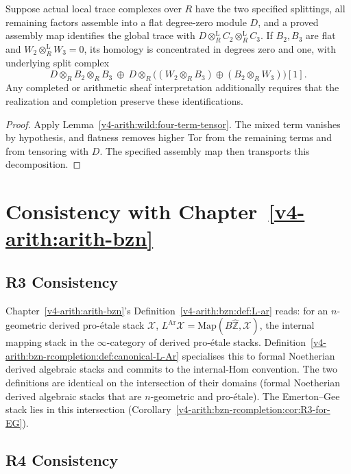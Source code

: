 \begin{corollary}
\label{v4-arith:bzn-rcompletion:cor:F3-corrected-closes}
Suppose actual local trace complexes over \(R\) have the two specified
splittings, all remaining factors assemble into a flat degree-zero
module \(D\), and a proved assembly map identifies the global trace
with \(D\otimes_R^{\mathrm L}C_2\otimes_R^{\mathrm L}C_3\).
If \(B_2,B_3\) are flat and
\(W_2\otimes_R^{\mathrm L}W_3=0\), its homology is concentrated in
degrees zero and one, with underlying split complex
\[
 D\otimes_R B_2\otimes_R B_3
 \ \oplus\
 D\otimes_R\bigl((W_2\otimes_R B_3)
          \oplus(B_2\otimes_R W_3)\bigr)[1].
\]
Any completed or arithmetic sheaf interpretation additionally requires
that the realization and completion preserve these identifications.
\end{corollary}
\begin{proof}
Apply Lemma~\ref{v4-arith:wild:four-term-tensor}.
The mixed term vanishes by hypothesis, and flatness removes higher
Tor from the remaining terms and from tensoring with \(D\).
The specified assembly map then transports this decomposition.
\end{proof}

\section{Consistency with Chapter~\ref{v4-arith:arith-bzn}}
\label{v4-arith:bzn-rcompletion:consistency}

\subsection{R3 Consistency}

Chapter~\ref{v4-arith:arith-bzn}'s
Definition~\ref{v4-arith:bzn:def:L-ar} reads: for an \(n\)-geometric derived
pro-\'etale stack \(\mathcal{X}\), \(L^{\mathrm{Ar}}\mathcal{X}=\mathrm{Map}(B\widehat{\mathbb{Z}},\mathcal{X})\),
the internal mapping stack in the \(\infty\)-category of derived
pro-\'etale stacks. Definition~\ref{v4-arith:bzn-rcompletion:def:canonical-L-Ar}
specialises this to formal Noetherian derived algebraic stacks
and commits to the internal-Hom convention. The two definitions
are identical on the intersection of their domains (formal
Noetherian derived algebraic stacks that are \(n\)-geometric and
pro-\'etale). The Emerton--Gee stack lies in this intersection
(Corollary~\ref{v4-arith:bzn-rcompletion:cor:R3-for-EG}).

\subsection{R4 Consistency}

